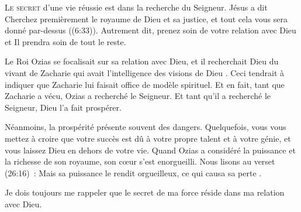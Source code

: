 



\lettrine{L}{e secret} d'une vie réussie est dans la recherche du Seigneur.
 Jésus a dit \Og Cherchez premièrement le royaume de Dieu et sa justice,
 et tout cela vous sera donné par-dessus \Fg{} ((6:33)).
 Autrement dit, prenez soin de votre relation avec Dieu et Il prendra soin
 de tout le reste. 

Le Roi Ozias se focalisait sur sa relation avec Dieu,
 et \Og il recherchait Dieu du vivant de Zacharie qui avait l'intelligence
 des visions de Dieu \Fg.
 Ceci tendrait à indiquer que Zacharie lui faisait office de modèle spirituel.
 Et en fait, tant que Zacharie a vécu, Ozias a recherché le Seigneur.
 Et tant qu'il a recherché le Seigneur, Dieu l'a fait prospérer.


Néanmoins, la prospérité présente souvent des dangers.
 Quelquefois, vous vous mettez à croire que votre succès est dû à votre propre
 talent et à votre génie, et vous laissez Dieu en dehors de votre vie.
 Quand Ozias a considéré la puissance et la richesse de son royaume,
 son c\oe{}ur s'est enorgueilli.
 Nous lisons au verset (26:16)~:
 \Og Mais sa puissance le rendit orgueilleux,
 ce qui causa sa perte \Fg{} \BFC.

Je dois toujours me rappeler que le secret de ma force réside
 dans ma relation avec Dieu. 

\dvrule







